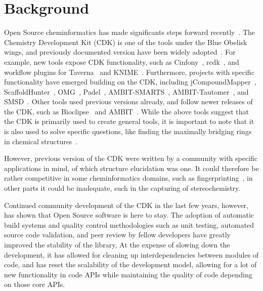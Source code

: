\documentclass[10pt]{bmcart}
\begin{document}
\section*{Background}

Open Source cheminformatics has made significants steps forward recently~\cite{OBoyle2011}.
The Chemistry Development Kit (CDK) is one of the tools under the Blue Obelisk wings,
and previously documented version have been widely adopted~\cite{Steinbeck2003,Steinbeck2006}.
For example, new tools expose CDK functionality, such as Cinfony~\cite{OBoyle2008},
rcdk~\cite{Guha2007}, and workflow plugins for Taverna~\cite{Truszkowski2011} and KNIME~\cite{Beisken2013}.
Furthermore, projects with specific functionality have emerged building on the CDK, including
jCompoundMapper~\cite{Hinselmann2011}, ScaffoldHunter~\cite{wetzel2009interactive}, OMG~\cite{Peironcely2012},
Padel~\cite{yap2011padel}, AMBIT-SMARTS~\cite{jeliazkova2011ambitsmarts}, AMBIT-Tautomer~\cite{kochev2013ambit},
and SMSD~\cite{Rahman2009,Rahman2014}. Other tools used previous versions already, and follow
newer releases of the CDK, such as Bioclipse~\cite{spjuth2007bioclipse,
spjuth2009bioclipse} and AMBIT~\cite{jeliazkova2011ambit}. While the above
tools suggest that the CDK is primarily used to create general tools, it is
important to note that it is also used to solve specific questions, like finding
the maximally bridging rings in chemical structures~\cite{Marth2015}.

However, previous version of the CDK were written by a community with specific applications
in mind, of which structure elucidation was one. It could therefore be rather competitive
in some cheminformatics domains, such as fingerprinting~\cite{Clark2014,Cannon2006}, in other parts
it could be inadequate, such in the capturing of stereochemistry.

Continued community development of the CDK in the last few years, however, has shown that
Open Source software is here to stay. The adoption of automatic build systems and
quality control methodologies such as unit testing, automated source code validation,
and peer review by fellow developers have greatly improved the stability of the library,
At the expense of slowing down the development, it has allowed for cleaning up interdependencies
between modules of code, and has reset the scalability of the development model,
allowing for a lot of new functionality in code APIs while maintaining the quality
of code depending on those core APIs.
\end{document}
